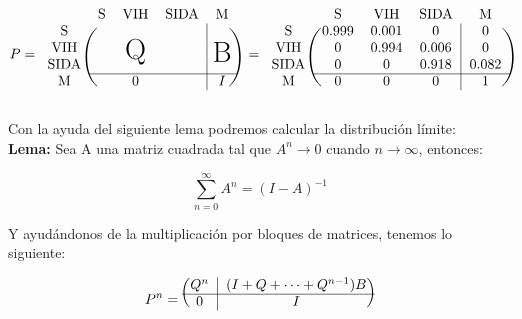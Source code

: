 \documentclass[11pt]{article}
\def\Big#1{\makebox(0,0){\huge#1}}
\begin{document}
\begin{equation*}
  P = 
  \begin{blockarray}{ccccc}
    & \text{S} & \text{VIH} & \text{SIDA} & \text{M} \\
   \begin{block}{c(ccc|c)}
     \text{S}    & & & & \\
     \text{VIH}  & & \Big{Q} & & \Big{B} \\
     \text{SIDA} & & & & \\
     \cline{2-5}
     \text{M}    & & 0 & & I \\
   \end{block}
  \end{blockarray}
  \;\; =
  \begin{blockarray}{ccccc}
     & \text{S} & \text{VIH} & \text{SIDA} & \text{M} \\
    \begin{block}{c(ccc|c)}
      \text{S}    & 0.999 & 0.001 & 0     & 0 \\
      \text{VIH}  & 0     & 0.994 & 0.006 & 0 \\
      \text{SIDA} & 0     & 0     & 0.918 & 0.082 \\
      \cline{2-5}
      \text{M}    & 0     & 0     & 0     & 1 \\
    \end{block}
  \end{blockarray}
\end{equation*}

Con la ayuda del siguiente lema podremos calcular la distribución límite: \\

\textbf{Lema:} Sea A una matriz cuadrada tal que $ A^n \rightarrow 0 $ cuando
$ n \rightarrow \infty $, entonces:

\begin{equation*}
  \sum_{n = 0}^{\infty} A^n = (I - A)^{-1}
\end{equation*}

Y ayudándonos de la multiplicación por bloques de matrices, tenemos lo siguiente:

\begin{equation*}
  P^n = 
  \begin{blockarray}{cc}
   \begin{block}{(c|c)}
    Q^n & (I + Q + \dots + Q^{n-1})B \\
    \cline{1-2}
    0 & I \\
   \end{block}
  \end{blockarray}
\end{equation*}
\end{document}
